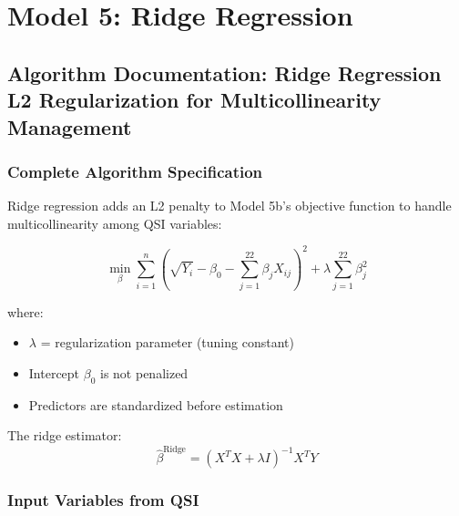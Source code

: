 \chapter{Model 5: Ridge Regression}\newpage

\section{Algorithm Documentation: Ridge Regression\\L2 Regularization for Multicollinearity Management}

\subsection{Complete Algorithm Specification}

Ridge regression adds an L2 penalty to Model 5b's objective function to handle multicollinearity among QSI variables:

\begin{equation}
\min_{\beta} \sum_{i=1}^n \left(\sqrt{Y_i} - \beta_0 - \sum_{j=1}^{22} \beta_j X_{ij}\right)^2 + \lambda \sum_{j=1}^{22} \beta_j^2
\end{equation}

where:
\begin{itemize}
    \item $\lambda$ = regularization parameter (tuning constant)
    \item Intercept $\beta_0$ is not penalized
    \item Predictors are standardized before estimation
\end{itemize}

The ridge estimator:
\begin{equation}
\hat{\beta}^{\text{Ridge}} = (X^TX + \lambda I)^{-1}X^TY
\end{equation}

\subsection{Input Variables from QSI}


